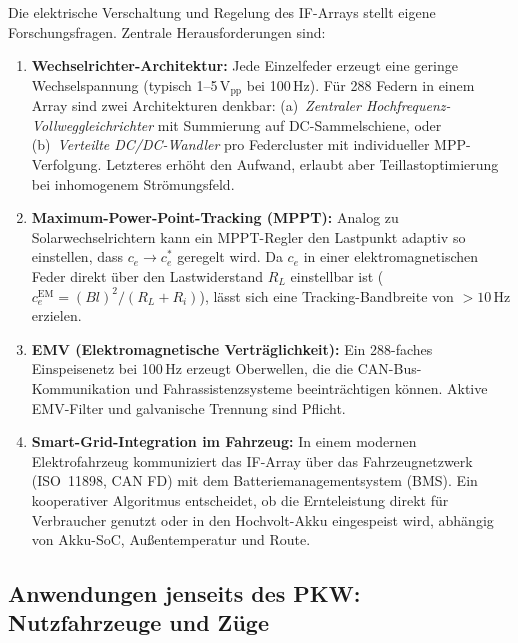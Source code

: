 ﻿\documentclass[12pt, a4paper]{report}
\theoremstyle{definition}
\theoremstyle{remark}
\begin{document}
Die elektrische Verschaltung und Regelung des IF-Arrays stellt eigene
Forschungsfragen. Zentrale Herausforderungen sind:

\begin{enumerate}[leftmargin=2em]
  \item \textbf{Wechselrichter-Architektur:} Jede Einzelfeder erzeugt eine
        geringe Wechselspannung (typisch 1--5\,V$_{\text{pp}}$ bei 100\,Hz).
        Für 288 Federn in einem Array sind zwei Architekturen denkbar:
        (a)~\emph{Zentraler Hochfrequenz-Vollweggleichrichter} mit Summierung
        auf DC-Sammelschiene, oder (b)~\emph{Verteilte DC/DC-Wandler} pro
        Federcluster mit individueller MPP-Verfolgung. Letzteres erhöht den
        Aufwand, erlaubt aber Teillastoptimierung bei inhomogenem Strömungsfeld.

  \item \textbf{Maximum-Power-Point-Tracking (MPPT):} Analog zu
        Solar\-wechsel\-richtern kann ein MPPT-Regler den Lastpunkt adaptiv
        so einstellen, dass $c_e \to c_e^*$ geregelt wird. Da $c_e$ in einer
        elektromagnetischen Feder direkt über den Lastwiderstand $R_L$ einstellbar
        ist ($c_e^{\text{EM}} = (Bl)^2/(R_L+R_i)$), lässt sich eine
        Tracking-Bandbreite von $> 10\,\text{Hz}$ erzielen.

  \item \textbf{EMV (Elektromagnetische Verträglichkeit):} Ein 288-faches
        Einspeisenetz bei 100\,Hz erzeugt Oberwellen, die die CAN-Bus-Kommunikation
        und Fahrassistenzsysteme beeinträchtigen können. Aktive EMV-Filter
        und galvanische Trennung sind Pflicht.

  \item \textbf{Smart-Grid-Integration im Fahrzeug:} In einem modernen
        Elektro\-fahrzeug kommuniziert das IF-Array über das Fahrzeugnetzwerk
        (ISO~11898, CAN FD) mit dem Batterie\-management\-system (BMS). Ein
        kooperativer Algoritmus entscheidet, ob die Ernteleistung direkt
        für Verbraucher genutzt oder in den Hochvolt-Akku eingespeist wird,
        abhängig von Akku-SoC, Außentemperatur und Route.
\end{enumerate}

\subsection{Anwendungen jenseits des PKW: Nutzfahrzeuge und Züge}
\label{ssec:ausblick_nutzfahrzeuge}
\end{document}
